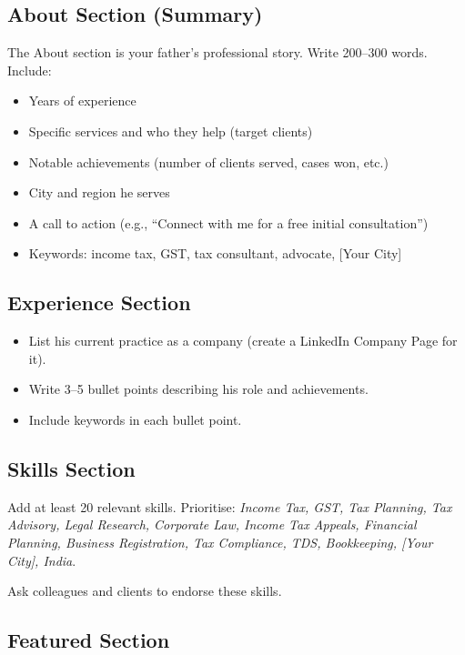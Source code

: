 \documentclass[12pt, a4paper]{book}
\begin{document}
\subsection{About Section (Summary)}

The About section is your father's professional story. Write 200--300 words.
Include:
\begin{itemize}[leftmargin=1.5em]
  \item Years of experience
  \item Specific services and who they help (target clients)
  \item Notable achievements (number of clients served, cases won, etc.)
  \item City and region he serves
  \item A call to action (e.g., ``Connect with me for a free initial consultation'')
  \item Keywords: income tax, GST, tax consultant, advocate, [Your City]
\end{itemize}

\subsection{Experience Section}

\begin{itemize}[leftmargin=1.5em]
  \item List his current practice as a company (create a LinkedIn Company Page for it).
  \item Write 3--5 bullet points describing his role and achievements.
  \item Include keywords in each bullet point.
\end{itemize}

\subsection{Skills Section}

Add at least 20 relevant skills. Prioritise:
\textit{Income Tax, GST, Tax Planning, Tax Advisory, Legal Research,
Corporate Law, Income Tax Appeals, Financial Planning, Business Registration,
Tax Compliance, TDS, Bookkeeping, [Your City], India}.

Ask colleagues and clients to endorse these skills.

\subsection{Featured Section}
\end{document}
